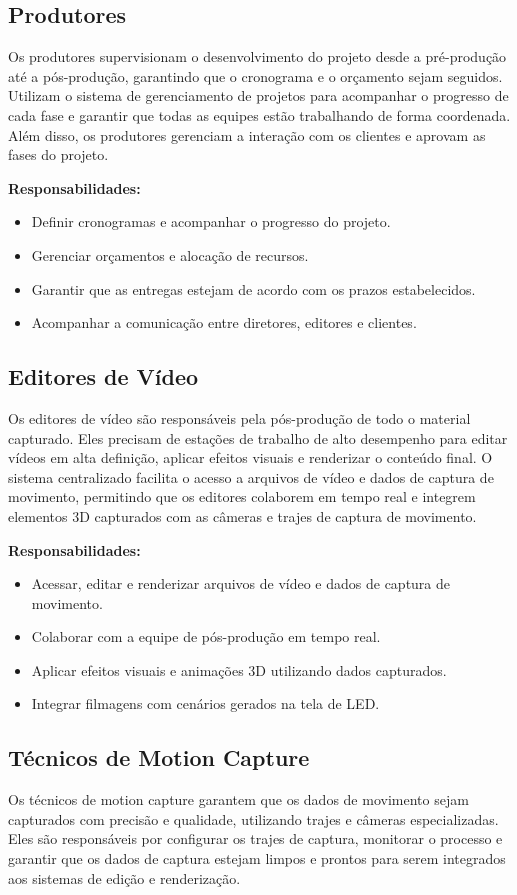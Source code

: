 \subsection{Produtores}
Os produtores supervisionam o desenvolvimento do projeto desde a pré-produção até a pós-produção, garantindo que o cronograma e o orçamento sejam seguidos. Utilizam o sistema de gerenciamento de projetos para acompanhar o progresso de cada fase e garantir que todas as equipes estão trabalhando de forma coordenada. Além disso, os produtores gerenciam a interação com os clientes e aprovam as fases do projeto.

\textbf{Responsabilidades:}
\begin{itemize}
  \item Definir cronogramas e acompanhar o progresso do projeto.
  \item Gerenciar orçamentos e alocação de recursos.
  \item Garantir que as entregas estejam de acordo com os prazos estabelecidos.
  \item Acompanhar a comunicação entre diretores, editores e clientes.
\end{itemize}

\subsection{Editores de Vídeo}
Os editores de vídeo são responsáveis pela pós-produção de todo o material capturado. Eles precisam de estações de trabalho de alto desempenho para editar vídeos em alta definição, aplicar efeitos visuais e renderizar o conteúdo final. O sistema centralizado facilita o acesso a arquivos de vídeo e dados de captura de movimento, permitindo que os editores colaborem em tempo real e integrem elementos 3D capturados com as câmeras e trajes de captura de movimento.

\textbf{Responsabilidades:}
\begin{itemize}
  \item Acessar, editar e renderizar arquivos de vídeo e dados de captura de movimento.
  \item Colaborar com a equipe de pós-produção em tempo real.
  \item Aplicar efeitos visuais e animações 3D utilizando dados capturados.
  \item Integrar filmagens com cenários gerados na tela de LED.
\end{itemize}

\subsection{Técnicos de Motion Capture}
Os técnicos de motion capture garantem que os dados de movimento sejam capturados com precisão e qualidade, utilizando trajes e câmeras especializadas. Eles são responsáveis por configurar os trajes de captura, monitorar o processo e garantir que os dados de captura estejam limpos e prontos para serem integrados aos sistemas de edição e renderização.

